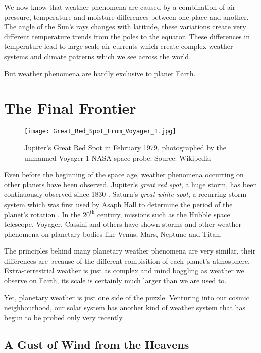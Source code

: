 We now know that weather phenomena are caused by a combination of air pressure, temperature and moisture differences 
between one place and another. The angle of the Sun's rays changes with latitude, these variations create very 
different temperature trends from the poles to the equator. These differences in temperature lead to large scale 
air currents which create complex weather systems and climate patterns which we see across the world.

But weather phenomena are hardly exclusive to planet Earth.

\section*{The Final Frontier}

\begin{wrapfigure}{r}{0.4\textwidth}
    \centering\texttt{[image: Great\_Red\_Spot\_From\_Voyager\_1.jpg]}
    \caption{
        \small Jupiter's Great Red Spot in February 1979, photographed by the unmanned Voyager 1 NASA space probe. 
        Source: Wikipedia
    }
    \label{fig:jupiter}
\end{wrapfigure}

Even before the beginning of the space age, weather phenomena occurring on other planets have been observed. Jupiter's 
\emph{great red spot}, a huge storm, has been continuously observed since 1830 \citetext{see \citealp{britannicaRedSpot}}.
Saturn's \emph{great white spot}, a recurring storm system which was first used by Asaph Hall to determine the period of
the planet's rotation \citep{wikisaturn}. In the $20^{\text{th}}$ century, missions such as the Hubble space telescope, 
Voyager, Cassini and others have shown storms and other weather phenomena on planetary bodies like Venus, Mars, 
Neptune and Titan. 

The principles behind many planetary weather phenomena are very similar, their differences are because of the different 
compisition of each planet's atmosphere. Extra-terrestrial weather is just as complex and mind boggling as weather we 
observe on Earth, its scale is certainly much larger than we are used to. 

Yet, planetary weather is just one side of the puzzle. Venturing into our cosmic neighbourhood, our solar system
has another kind of weather system that has begun to be probed only very recently. 

\subsection*{A Gust of Wind from the Heavens}


